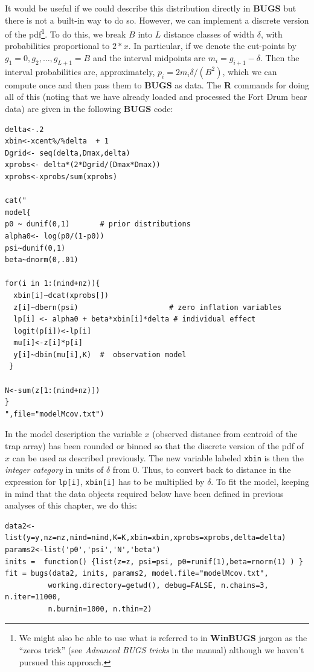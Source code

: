 It would be useful if we could describe this distribution directly in {\bf
  BUGS} but there is not a built-in way to do so. However, we can 
implement a discrete version of the pdf\footnote{We might
also be able to use what is referred to in {\bf WinBUGS} jargon as the
``zeros trick'' (see {\it Advanced BUGS tricks} in the manual)
although we haven't pursued this approach.}. To do this, 
we break $B$ into $L$
distance classes of width $\delta$, with probabilities proportional to
$2*x$. In particular, if we denote the cut-points by $g_{1}=0,g_{2},
\ldots, g_{L+1}=B$ and the interval midpoints are $m_{i} =
g_{i+1}-\delta$.  
Then the interval probabilities are, approximately, $p_{i} =
2 m_{i} \delta/(B^{2})$, which we can compute once and then
pass them to {\bf BUGS} as data.
The {\bf R} commands for doing all of this (noting that we have
already loaded and processed the Fort Drum bear data) are given in the
following {\bf BUGS} code:
{\small
\begin{verbatim}
delta<-.2
xbin<-xcent%/%delta  + 1
Dgrid<- seq(delta,Dmax,delta)
xprobs<- delta*(2*Dgrid/(Dmax*Dmax))
xprobs<-xprobs/sum(xprobs)

cat("
model{
p0 ~ dunif(0,1)       # prior distributions
alpha0<- log(p0/(1-p0))
psi~dunif(0,1)
beta~dnorm(0,.01)

for(i in 1:(nind+nz)){
  xbin[i]~dcat(xprobs[])
  z[i]~dbern(psi)                     # zero inflation variables
  lp[i] <- alpha0 + beta*xbin[i]*delta # individual effect
  logit(p[i])<-lp[i]
  mu[i]<-z[i]*p[i]
  y[i]~dbin(mu[i],K)  #  observation model
 }

N<-sum(z[1:(nind+nz)])
}
",file="modelMcov.txt")
\end{verbatim}
}
In the model description the variable $x$ (observed distance
from centroid of the trap array) has been rounded or binned so that the discrete
version of the pdf of $x$ can be used as described previously. The new
variable labeled \mbox{\tt xbin} is then the {\it integer category}
in units of $\delta$ from 0. Thus, to convert back to distance in the
expression for \mbox{\tt lp[i]}, \mbox{\tt xbin[i]} has to be multiplied by
$\delta$. 
To fit the model, keeping in mind that the data objects
required below have been defined in previous analyses of this chapter,
we do this:
{\small
\begin{verbatim}
data2<-list(y=y,nz=nz,nind=nind,K=K,xbin=xbin,xprobs=xprobs,delta=delta)
params2<-list('p0','psi','N','beta')
inits =  function() {list(z=z, psi=psi, p0=runif(1),beta=rnorm(1) ) }
fit = bugs(data2, inits, params2, model.file="modelMcov.txt",
          working.directory=getwd(), debug=FALSE, n.chains=3, n.iter=11000,
          n.burnin=1000, n.thin=2)
\end{verbatim}
}

